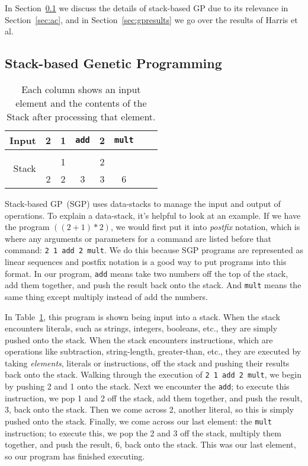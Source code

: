 \documentclass{sig-alternate}
\begin{document}
In Section~\ref{sec:sgp} we discuss the details of stack-based GP due to its relevance in Section~\ref{sec:ac}, and in Section~\ref{sec:gpresults} we go over the results of Harris et al.

\subsection{Stack-based Genetic Programming}
\label{sec:sgp}
\begin{table}
	\centering
	\begin{tabular}{|r|c|c|c|c|c|c|c|}
		\hline
		Input & 2 & 1 & \texttt{add} & 2 & \texttt{mult} \\
		\hline
		\multirow{3}{*}{Stack} & & & & &\\
		&   & 1 &   & 2 &   \\
		& 2 & 2 & 3 & 3 & 6 \\
		\hline
	\end{tabular}
	\caption{Each column shows an input element and the contents of the Stack after processing that element.}
	\label{tab:stacks}
\end{table}

Stack-based GP~(SGP) uses data-stacks to manage the input and output of operations. To explain a data-stack, it's helpful to look at an example. If we have the program $((2+1)*2)$, we would first put it into \textit{postfix} notation, which is where any arguments or parameters for a command are listed before that command: \texttt{2~1~add~2~mult}. We do this because SGP programs are represented as linear sequences and postfix notation is a good way to put programs into this format. In our program, \texttt{add} means take two numbers off the top of the stack, add them together, and push the result back onto the stack. And \texttt{mult} means the same thing except multiply instead of add the numbers.

In Table~\ref{tab:stacks}, this program is shown being input into a stack. When the stack encounters literals, such as strings, integers, booleans, etc., they are simply pushed onto the stack. When the stack encounters instructions, which are operations like subtraction, string-length, greater-than, etc., they are executed by taking \textit{elements}, literals or instructions, off the stack and pushing their results back onto the stack. Walking through the execution of \texttt{2~1~add~2~mult}, we begin by pushing 2 and 1 onto the stack. Next we encounter the \texttt{add}; to execute this instruction, we pop 1 and 2 off the stack, add them together, and push the result, 3, back onto the stack. Then we come across 2, another literal, so this is simply pushed onto the stack. Finally, we come across our last element: the \texttt{mult} instruction; to execute this, we pop the 2 and 3 off the stack, multiply them together, and push the result, 6, back onto the stack. This was our last element, so our program has finished executing.
\end{document}
